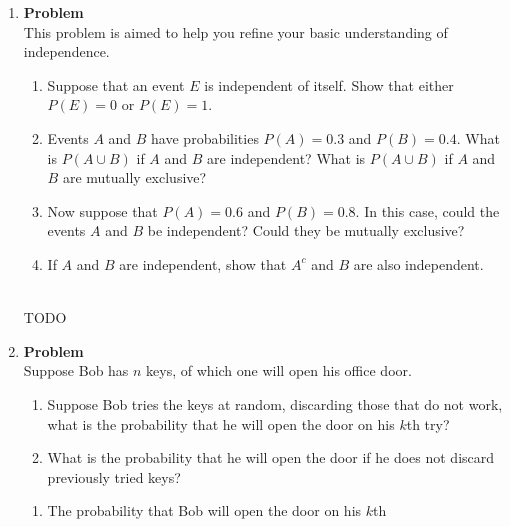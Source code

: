\documentclass[12pt]{article}
\newenvironment{Ex}{\textbf{Problem}\vspace{.75em}\\}{}
\begin{document}
\begin{enumerate}
\begin{Ex}
\begin{solution}
\begin{enumerate}
          engineers on the committee, so the probability that Two
          particular mechanical engineers cannot be together on the
          committee is $\frac{3}{10}$.
        \end{enumerate}
      \end{solution}
    \end{Ex}
  \item
    \begin{Ex}
      This problem is aimed to help you refine your basic
      understanding of independence.
      \begin{enumerate}
      \item Suppose that an event $E$ is independent of itself. Show
        that either $P(E) = 0$ or $P(E) = 1$.
      \item Events $A$ and $B$ have probabilities $P(A)=0.3$ and
        $P(B)=0.4$. What is $P(A \cup B)$ if $A$ and $B$ are
        independent? What is $P(A \cup B)$ if $A$ and $B$ are
        mutually exclusive?
      \item Now suppose that $P(A) = 0.6$ and $P(B) = 0.8$. In this
        case, could the events $A$ and $B$ be independent? Could they
        be mutually exclusive?
      \item If $A$ and $B$ are independent, show that $A^c$ and $B$
        are also independent.
      \end{enumerate}
      \begin{solution} \hfill \\
        {\huge TODO}
      \end{solution}
    \end{Ex}
  \item
    \begin{Ex}
      Suppose Bob has $n$ keys, of which one will open his office
      door.
      \begin{enumerate}
      \item Suppose Bob tries the keys at random, discarding those
        that do not work, what is the probability that he will open
        the door on his $k$th try?
      \item What is the probability that he will open the door if he
        does not discard previously tried keys?
      \end{enumerate}
      \begin{solution} \hfill
        \begin{enumerate}
        \item The probability that Bob will open the door on his $k$th

\end{enumerate}
\end{solution}
\end{Ex}
\end{enumerate}
\end{document}
